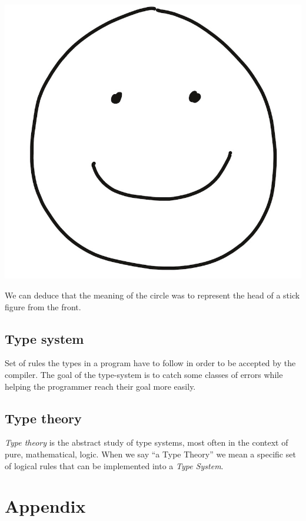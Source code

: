 \documentclass[
]{article}
\begin{document}
\includegraphics{Smiley smol.jpeg}

We can deduce that the meaning of the circle was to represent the head
of a stick figure from the front.

\hypertarget{type-system-1}{%
\subsection{Type system}\label{type-system-1}}

Set of rules the types in a program have to follow in order to be
accepted by the compiler. The goal of the type-system is to catch some
classes of errors while helping the programmer reach their goal more
easily.

\hypertarget{type-theory}{%
\subsection{Type theory}\label{type-theory}}

\emph{Type theory} is the abstract study of type systems, most often in
the context of pure, mathematical, logic. When we say ``a Type Theory''
we mean a specific set of logical rules that can be implemented into a
\emph{Type System}.

 


\hypertarget{appendix}{%
\section{Appendix}\label{appendix}}
\end{document}
